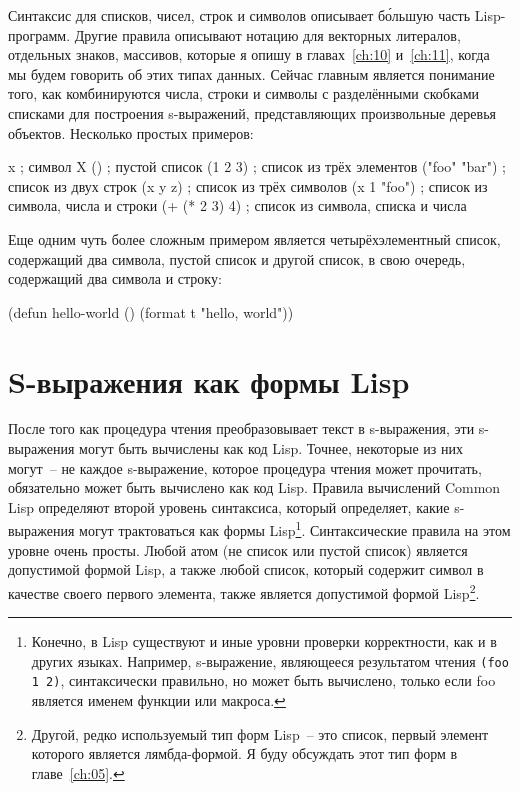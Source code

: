 Синтаксис для списков, чисел, строк и символов описывает б\'{о}льшую часть Lisp-программ.
Другие правила описывают нотацию для векторных литералов, отдельных знаков, массивов,
которые я опишу в главах~\ref{ch:10} и~\ref{ch:11}, когда мы будем говорить об этих типах
данных. Сейчас главным является понимание того, как комбинируются числа, строки и символы
с разделёнными скобками списками для построения s-выражений, представляющих произвольные
деревья объектов. Несколько простых примеров:

\begin{myverb}
  x             ; символ X
  ()            ; пустой список
  (1 2 3)       ; список из трёх элементов
  ("foo" "bar") ; список из двух строк
  (x y z)       ; список из трёх символов
  (x 1 "foo")   ; список из символа, числа и строки
  (+ (* 2 3) 4) ; список из символа, списка и числа
\end{myverb}

Еще одним чуть более сложным примером является четырёхэлементный список, содержащий два
символа, пустой список и другой список, в свою очередь, содержащий два символа и строку:

\begin{myverb}
  (defun hello-world ()
    (format t "hello, world"))
\end{myverb}

\section{S-выражения как формы Lisp}

После того как процедура чтения преобразовывает текст в s-выражения, эти s-выражения
могут быть вычислены как код Lisp. Точнее, некоторые из них могут~-- не каждое s-выражение,
которое процедура чтения может прочитать, обязательно может быть вычислено как код
Lisp. Правила вычислений Common Lisp определяют второй уровень синтаксиса, который
определяет, какие s-выражения могут трактоваться как формы Lisp\footnote{Конечно, в Lisp
  существуют и иные уровни проверки корректности, как и в других языках. Например,
  s-выражение, являющееся результатом чтения \lstinline{(foo 1 2)}, синтаксически правильно, но
  может быть вычислено, только если foo является именем функции или
  макроса.}. Синтаксические правила на этом уровне очень просты. Любой атом (не список или
пустой список) является допустимой формой Lisp, а также любой список, который содержит
символ в качестве своего первого элемента, также является допустимой формой
Lisp\footnote{Другой, редко используемый тип форм Lisp~-- это список, первый элемент
  которого является лямбда-формой. Я буду обсуждать этот тип форм в главе~\ref{ch:05}.}.

